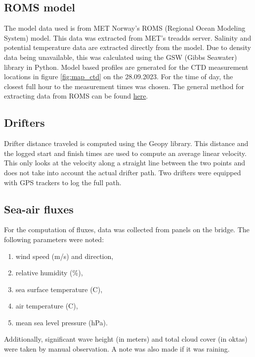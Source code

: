 \documentclass[a4paper,10pt,english]{article}
\begin{document}
\subsection{ROMS model}
The model data used is from MET Norway's ROMS (Regional Ocean Modeling System) model. This data was extracted from MET's treadds server.
Salinity and potential temperature data are extracted directly from the model. Due to density data being unavailable, this was calculated using the GSW (Gibbs Seawater) library in Python. Model based profiles are generated for the CTD measurement locations in figure \ref*{fig:map_ctd} on the 28.09.2023. For the time of day, the closest full hour to the measurement times was chosen. The general method for extracting data from ROMS can be found \href{https://github.com/kaihc/GEO2320/blob/main/cruise/extract_salt_temp_roms_from_metno_thredds.ipynb}{here}.


\subsection{Drifters}
Drifter distance traveled is computed using the Geopy library. This distance and the logged start and finish times are used to compute an average linear velocity. This only looks at the velocity along a straight line between the two points and does not take into account the actual drifter path. Two drifters were equipped with GPS trackers to log the full path.

\subsection{Sea-air fluxes}
For the computation of fluxes, data was collected from panels on the bridge. The following parameters were noted:
\begin{enumerate}[label=--, itemsep=0pt,parsep=0pt]
        \item wind speed (m/s) and direction,
        \item relative humidity (\%),
        \item sea surface temperature (\textdegree C),
        \item air temperature (\textdegree C),
        \item mean sea level pressure (hPa).
\end{enumerate}

Additionally, significant wave height (in meters) and total cloud cover (in oktas) were taken by manual observation. A note was also made if it was raining.
\end{document}
